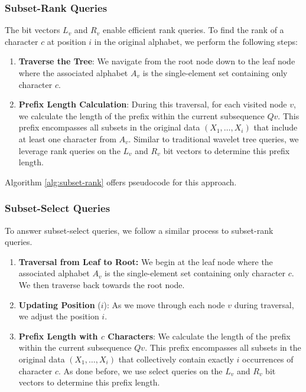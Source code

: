 \subsubsection{Subset-Rank Queries} \label{sec:subset_rank_queries}

\noindent The bit vectors $L_v$ and $R_v$ enable efficient rank queries. To find the rank of a character $c$ at position $i$ in the original alphabet, we perform the following steps:
\begin{enumerate}
    \item \textbf{Traverse the Tree}: We navigate from the root node down to the leaf node where the associated alphabet $A_v$ is the single-element set containing only character $c$.
    \item \textbf{Prefix Length Calculation}: During this traversal, for each visited node $v$, we calculate the length of the prefix within the current subsequence $Qv$. This prefix encompasses all subsets in the original data $(X_1,\dots, X_i)$ that include at least one character from $A_v$. Similar to traditional wavelet tree queries, we leverage rank queries on the $L_v$ and $R_v$ bit vectors to determine this prefix length.
\end{enumerate}
Algorithm \ref{alg:subset-rank} offers pseudocode for this approach.

\subsubsection{Subset-Select Queries} \label{sec:subset_select_queries}

To answer subset-select queries, we follow a similar process to subset-rank queries.

\begin{enumerate}
    \item \textbf{Traversal from Leaf to Root:} We begin at the leaf node where the associated alphabet $A_v$ is the single-element set containing only character $c$. We then traverse back towards the root node.
    \item \textbf{Updating Position} ($i$): As we move through each node $v$ during traversal, we adjust the position $i$.
    \item \textbf{Prefix Length with $c$ Characters}: We calculate the length of the prefix within the current subsequence $Qv$. This prefix encompasses all subsets in the original data $(X_1,\dots, X_i)$ that collectively contain exactly $i$ occurrences of character $c$. As done before, we use select queries on the $L_v$ and $R_v$ bit vectors to determine this prefix length.
\end{enumerate}

